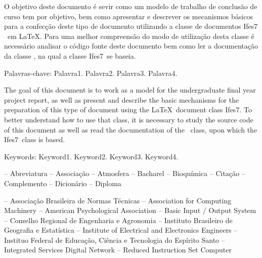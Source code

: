 \documentclass[times,english,brazil,oneside]{ifes8}
\newcommand{\ifestex}{\textsf{Ifes$7$}}
\begin{document}
\begin{resumo}
  O objetivo deste documento é sevir como um modelo de trabalho de
  conclusão de curso tem por objetivo, bem como apresentar e descrever
  os mecanismos básicos para a confecção deste tipo de documento
  utilizando a classe de documentos \ifestex\ em \LaTeX.
  Para uma melhor compreensão do modo de utilização desta classe é
  necessário analisar o código fonte deste documento bem como ler a
  documentação da classe \abnTeX, na qual a classe \ifestex\ se
  baseia.

  Palavras-chave: Palavra1. Palavra2. Palavra3. Palavra4.
\end{resumo}

\begin{resumo}[Abstract]
  \begin{otherlanguage}{english}
    The goal of this document is to work as a model for the
    undergraduate final year project report, as well as present and
    describe the basic mechanisms for the preparation of this type of
    document using the \LaTeX\ document class \ifestex.
    To better understand how to use that class, it is necessary to
    study the source code of this document as well as read the
    documentation of the \abnTeX\ class, upon which the \ifestex\
    class is based.

    Keywords: Keyword1. Keyword2. Keyword3. Keyword4.
  \end{otherlanguage}
\end{resumo}


\renewcommand{\listfigurename}{Lista de figuras}
\pdfbookmark[0]{\listfigurename}{lof}
\listoffigures*
\cleardoublepage


\listoftables*
\cleardoublepage


\listadequadros*
\cleardoublepage


\begin{abreviaturas}
   -- Abreviatura
   -- Associação
   -- Atmosfera
   -- Bacharel
   -- Bioquímica
   -- Citação
   -- Complemento
   -- Dicionário
   -- Diploma
\end{abreviaturas}


\begin{siglas}
   -- Associação Brasileira de Normas Técnicas
   -- Association for Computing Machinery
   -- American Psychological Association
   -- Basic Input / Output System
   -- Conselho Regional de Engenharia e Agronomia
   -- Instituto Brasileiro de Geografia e Estatística
  \simb{IEEE} -- Institute of Electrical and Electronics Engineers
  \simb{Ifes} -- Instituo Federal de Educação, Ciência e Tecnologia do Espírito Santo
  \simb{ISDN} -- Integrated Services Digital Network
   -- Reduced Instruction Set Computer
\end{siglas}
\end{document}
